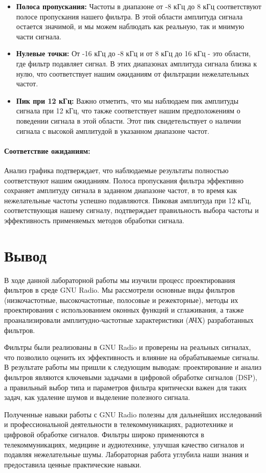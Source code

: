 \documentclass[a4paper,12pt]{extarticle}
\begin{document}
\begin{itemize}
    \item \textbf{Полоса пропускания:}
    Частоты в диапазоне от -8 кГц до 8 кГц соответствуют полосе пропускания нашего фильтра. В этой области амплитуда сигнала остается значимой, и мы можем наблюдать как реальную, так и мнимую части сигнала.
    
    \item \textbf{Нулевые точки:}
    От -16 кГц до -8 кГц и от 8 кГц до 16 кГц - это области, где фильтр подавляет сигнал. В этих диапазонах амплитуда сигнала близка к нулю, что соответствует нашим ожиданиям от фильтрации нежелательных частот.
    
    \item \textbf{Пик при 12 кГц:}
    Важно отметить, что мы наблюдаем пик амплитуды сигнала при 12 кГц, что также соответствует нашим предположениям о поведении сигнала в этой области. Этот пик свидетельствует о наличии сигнала с высокой амплитудой в указанном диапазоне частот.
\end{itemize}

\paragraph{Соответствие ожиданиям:}
Анализ графика подтверждает, что наблюдаемые результаты полностью соответствуют нашим ожиданиям. 
Полоса пропускания фильтра эффективно сохраняет амплитуду сигнала в заданном диапазоне частот, в 
то время как нежелательные частоты успешно подавляются. Пиковая амплитуда при 12 кГц, 
соответствующая нашему сигналу, подтверждает правильность выбора частоты и эффективность 
применяемых методов обработки сигнала.


\newpage
\section{Вывод}
\hspace{1.15cm}В ходе данной лабораторной работы мы изучили процесс проектирования фильтров в 
среде GNU Radio. Мы рассмотрели основные виды фильтров (низкочастотные, высокочастотные, полосовые 
и режекторные), методы их проектирования с использованием оконных функций и сглаживания, а также 
проанализировали амплитудно-частотные характеристики (АЧХ) разработанных фильтров. 

\hspace{1.15cm}Фильтры были реализованы в GNU Radio и проверены на реальных сигналах, что 
позволило оценить их эффективность и влияние на обрабатываемые сигналы. В результате работы мы 
пришли к следующим выводам: проектирование и анализ фильтров являются ключевыми задачами в 
цифровой обработке сигналов (DSP), а правильный выбор типа и параметров фильтра критически важен 
для таких задач, как удаление шумов и выделение полезного сигнала. 

\hspace{1.15cm}Полученные навыки работы с GNU Radio полезны для дальнейших исследований и 
профессиональной деятельности в телекоммуникациях, радиотехнике и цифровой обработке сигналов. 
Фильтры широко применяются в телекоммуникациях, медицине и аудиотехнике, улучшая качество сигналов 
и подавляя нежелательные шумы. Лабораторная работа углубила наши знания и предоставила ценные 
практические навыки.
\end{document}
